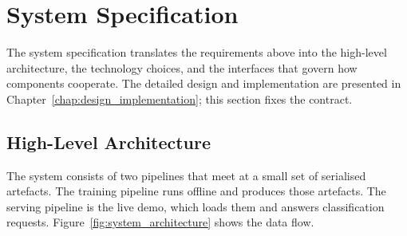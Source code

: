 \section{System Specification}
\label{sec:system_specification}

\par The system specification translates the requirements above into the high-level architecture, the technology choices, and the interfaces that govern how components cooperate. The detailed design and implementation are presented in Chapter~\ref{chap:design_implementation}; this section fixes the contract.

\subsection{High-Level Architecture}
\label{subsec:high_level_architecture}

\par The system consists of two pipelines that meet at a small set of serialised artefacts. The training pipeline runs offline and produces those artefacts. The serving pipeline is the live demo, which loads them and answers classification requests. Figure~\ref{fig:system_architecture} shows the data flow.


